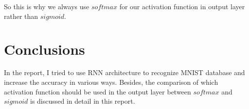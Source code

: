 \documentclass[a4paper,10pt]{article}
\begin{document}
So this is why we always use $softmax$ for our activation function in output layer rather than $sigmoid$.


\section{Conclusions}
In the report, I tried to use RNN architecture to recognize MNIST database and increase the accuracy in various ways. Besides, the comparison of which activation function should be used in the output layer between $softmax$ and $sigmoid$ is discussed in detail in this report.


\newpage

\renewcommand\refname{Reference}


\end{document}
